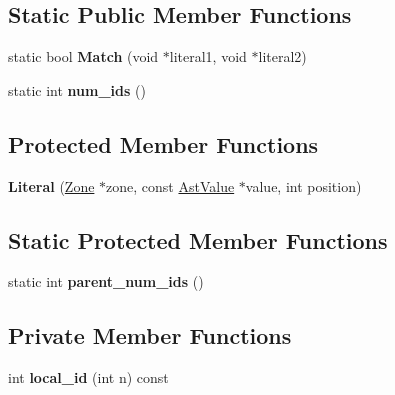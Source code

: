 \subsection*{Static Public Member Functions}
\begin{DoxyCompactItemize}
\item 
static bool {\bfseries Match} (void $\ast$literal1, void $\ast$literal2)\hypertarget{classv8_1_1internal_1_1_literal_a1035dab7bb6d4fab33e9ebae88d93673}{}\label{classv8_1_1internal_1_1_literal_a1035dab7bb6d4fab33e9ebae88d93673}

\item 
static int {\bfseries num\+\_\+ids} ()\hypertarget{classv8_1_1internal_1_1_literal_aa69741197f09fd7b75c636b22388bda4}{}\label{classv8_1_1internal_1_1_literal_aa69741197f09fd7b75c636b22388bda4}

\end{DoxyCompactItemize}
\subsection*{Protected Member Functions}
\begin{DoxyCompactItemize}
\item 
{\bfseries Literal} (\hyperlink{classv8_1_1internal_1_1_zone}{Zone} $\ast$zone, const \hyperlink{classv8_1_1internal_1_1_ast_value}{Ast\+Value} $\ast$value, int position)\hypertarget{classv8_1_1internal_1_1_literal_a27aa6b0b8ad24992b8eaefcda856322d}{}\label{classv8_1_1internal_1_1_literal_a27aa6b0b8ad24992b8eaefcda856322d}

\end{DoxyCompactItemize}
\subsection*{Static Protected Member Functions}
\begin{DoxyCompactItemize}
\item 
static int {\bfseries parent\+\_\+num\+\_\+ids} ()\hypertarget{classv8_1_1internal_1_1_literal_a6917fc48fda528f33b7294c2cbce2ed2}{}\label{classv8_1_1internal_1_1_literal_a6917fc48fda528f33b7294c2cbce2ed2}

\end{DoxyCompactItemize}
\subsection*{Private Member Functions}
\begin{DoxyCompactItemize}
\item 
int {\bfseries local\+\_\+id} (int n) const \hypertarget{classv8_1_1internal_1_1_literal_a00454b8acd895bf65585fc67461d2c42}{}\label{classv8_1_1internal_1_1_literal_a00454b8acd895bf65585fc67461d2c42}

\end{DoxyCompactItemize}
